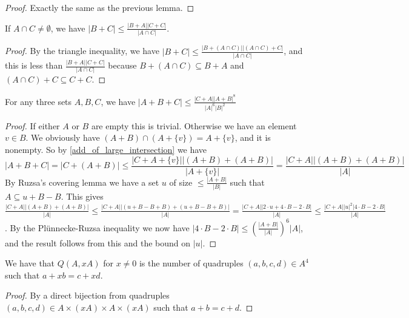 \begin{proof}
    \leanok
    Exactly the same as the previous lemma.
\end{proof}

\begin{lemma}
    \label{add_of_large_intersection}
    \leanok
    If $A \cap C \neq \emptyset$, we have $|B+C| \leq \frac{|B+A| |C+C|}{|A \cap C|}$.
\end{lemma}

\begin{proof}
    \leanok
    By the triangle inequality, we have $|B+C| \leq \frac{|B + (A \cap C)| |(A \cap C) + C|}{|A \cap C|}$,
    and this is less than $\frac{|B+A| |C+C|}{|A \cap C|}$ because
    $B + (A \cap C)\subseteq B+A$ and $(A \cap C) + C \subseteq C + C$.
\end{proof}

\begin{lemma}
    \label{triple_add}
    \leanok
    For any three sets $A, B, C$, we have $|A+B+C| \leq \frac{|C+A| |A+B|^8}{|A|^6 |B|^2}$
\end{lemma}

\begin{proof}
    \leanok
    If either $A$ or $B$ are empty this is trivial.
    Otherwise we have an element $v \in B$. We obviously have $(A + B) \cap (A + \{v\}) = A + \{v\}$, and
    it is nonempty. So by \ref{add_of_large_intersection} we have
    $$
    |A+B+C| = |C + (A+B)| \leq \frac{|C + A + \{v\}| |(A+B) + (A+B)|}{|A + \{v\}|} = 
    \frac{|C + A| |(A+B) + (A+B)|}{|A|}
    $$
    By Ruzsa's covering lemma we have a set $u$ of size $\leq \frac{|A+B|}{|B|}$ such that $A \subseteq u + B - B$.
    This gives $\frac{|C + A| |(A+B) + (A+B)|}{|A|} \leq \frac{|C + A| |(u+B-B+B) + (u+B-B+B)|}{|A|} =
    \frac{|C + A| |2 \cdot u + 4 \cdot B - 2 \cdot B|}{|A|} \leq \frac{|C + A| |u|^2 |4 \cdot B - 2 \cdot B|}{|A|}$.
    By the Plünnecke-Ruzsa inequality we now have $|4 \cdot B - 2 \cdot B| \leq (\frac{|A+B|}{|A|})^6 |A|$,
    and the result follows from this and the bound on $|u|$.
\end{proof}

\begin{lemma}
    \label{additive_mul_eq}
    \leanok
    We have that $Q(A, x A)$ for $x \neq 0$ is the number of quadruples $(a, b, c, d) \in A^4$ such that $a + x b = c + x d$.
\end{lemma}

\begin{proof}
    \leanok
    By a direct bijection from quadruples $(a, b, c, d) \in A \times (xA) \times A \times (xA)$ such that $a + b = c + d$.
\end{proof}